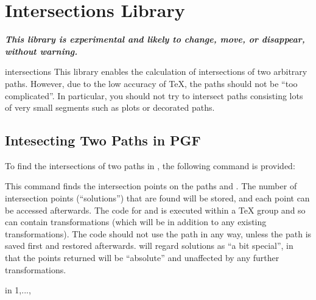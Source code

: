 %
%
%


\section{Intersections Library}

{\bf\emph{This library is experimental and likely to change,
move, or disappear, without warning.}}

\begin{pgflibrary}{intersections}
  This library enables the calculation of intersections of
  two arbitrary paths. However, due to the low accuracy of
  \TeX, the paths should not be ``too complicated''.
  In particular, you should not try to intersect paths consisting 
  lots of very small segments such as plots or decorated paths.
\end{pgflibrary}

\subsection{Intesecting Two Paths in PGF}
  
  To find the intersections of two paths in \pgfname, the following 
  command is provided:
   
\begin{command}{\pgfintersectionofpaths{}}
  This command finds the intersection points on the paths 
   and . The number of intersection points
  (``solutions'') that are found will be stored, and each point 
  can be accessed afterwards. The code for  and 
   is executed within a \TeX{} group and so can contain
  transformations (which will be in addition to any existing
  transformations). The code should not use the path in any way, 
  unless the path is saved first and restored afterwards.
  \pgfname{} will regard solutions as ``a bit
  special'', in that the points returned  will be ``absolute'' and 
  unaffected by any further transformations.

\begin{codeexample}[]
\begin{pgfpicture}
\pgfintersectionofpaths
{
  \pgfgetpath\temppath
  \pgfsetpath\temppath
}
{
  \pgfgetpath\temppath
  \pgfsetpath\temppath
}
\foreach \s in {1,...,\pgfintersectionsolutions}
  {\pgfpathcircle{\pgfpointintersectionsolution{\s}}{2pt}}
\end{pgfpicture}
\end{codeexample}

\end{command}

